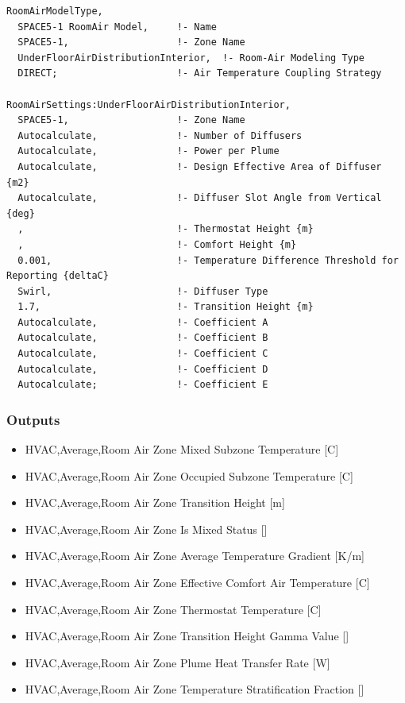 \begin{lstlisting}
RoomAirModelType,
  SPACE5-1 RoomAir Model,     !- Name
  SPACE5-1,                   !- Zone Name
  UnderFloorAirDistributionInterior,  !- Room-Air Modeling Type
  DIRECT;                     !- Air Temperature Coupling Strategy

RoomAirSettings:UnderFloorAirDistributionInterior,
  SPACE5-1,                   !- Zone Name
  Autocalculate,              !- Number of Diffusers
  Autocalculate,              !- Power per Plume
  Autocalculate,              !- Design Effective Area of Diffuser {m2}
  Autocalculate,              !- Diffuser Slot Angle from Vertical {deg}
  ,                           !- Thermostat Height {m}
  ,                           !- Comfort Height {m}
  0.001,                      !- Temperature Difference Threshold for Reporting {deltaC}
  Swirl,                      !- Diffuser Type
  1.7,                        !- Transition Height {m}
  Autocalculate,              !- Coefficient A
  Autocalculate,              !- Coefficient B
  Autocalculate,              !- Coefficient C
  Autocalculate,              !- Coefficient D
  Autocalculate;              !- Coefficient E
\end{lstlisting}

\subsubsection{Outputs}\label{roomairsettingsunderfloorairdistributioninterior-outputs}

\begin{itemize}
\item
  HVAC,Average,Room Air Zone Mixed Subzone Temperature {[}C{]}
\item
  HVAC,Average,Room Air Zone Occupied Subzone Temperature {[}C{]}
\item
  HVAC,Average,Room Air Zone Transition Height {[}m{]}
\item
  HVAC,Average,Room Air Zone Is Mixed Status {[]}
\item
  HVAC,Average,Room Air Zone Average Temperature Gradient {[}K/m{]}
\item
  HVAC,Average,Room Air Zone Effective Comfort Air Temperature {[}C{]}
\item
  HVAC,Average,Room Air Zone Thermostat Temperature {[}C{]}
\item
  HVAC,Average,Room Air Zone Transition Height Gamma Value {[]}
\item
  HVAC,Average,Room Air Zone Plume Heat Transfer Rate {[}W{]}
\item
  HVAC,Average,Room Air Zone Temperature Stratification Fraction {[]}
\end{itemize}

